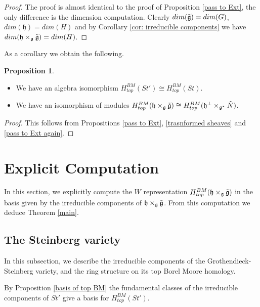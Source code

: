 \documentclass[12pt]{article}
\theoremstyle{plain}
\theoremstyle{definition}
\newtheorem{prop}[theorem]{Proposition}
\begin{document}
\begin{proof}
    The proof is almost identical to the proof of Proposition \ref{pass to Ext}, the only difference is the dimension computation. Clearly $dim(\Tilde{\mathfrak{g}})=dim(G)$, $dim(\mathfrak{h})=dim(H)$ and by Corollary \ref{cor: irreducible components} we have $dim(\mathfrak{h}\times_{\mathfrak{g}}\Tilde{\mathfrak{g}})=dim(H)$.
\end{proof}

As a corollary we obtain the following.

\begin{prop}\label{Fourier isomorphism}
    \begin{itemize}
        \item We have an algebra isomorphism $H^{BM}_{top}(St')\cong H^{BM}_{top}(St)$.
        \item We have an isomorphism of modules $H^{BM}_{top}(\mathfrak{h}\times_{\mathfrak{g}}\Tilde{\mathfrak{g}})\cong H^{BM}_{top}(\mathfrak{h}^\perp\times_{\mathfrak{g}^*}\Tilde{N})$.
    \end{itemize}
\end{prop}

\begin{proof}
    This follows from Propositions \ref{pass to Ext}, \ref{trasnformed sheaves} and \ref{pass to Ext again}.
\end{proof}











\section{Explicit Computation}\label{s3}
In this section, we explicitly compute the $W$ representation $H^{BM}_{top}(\mathfrak{h}\times_{\mathfrak{g}}\Tilde{\mathfrak{g}})$ in the basis given by the irreducible components of $\mathfrak{h}\times_{\mathfrak{g}}\Tilde{\mathfrak{g}}$.  From this computation we deduce Theorem \ref{main}.
\subsection{The Steinberg variety}
In this subsection, we describe the irreducible components of the Grothendieck-Steinberg variety, and the ring structure on its top Borel Moore homology.

By Proposition \ref{basis of top BM} the fundamental classes of the irreducible components of $St'$ give a basis for $H_{top}^{BM}(St')$.
\end{document}
